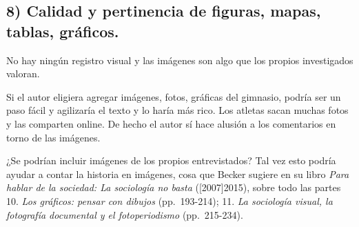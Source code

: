 \subsection*{8) Calidad y pertinencia de figuras, mapas, tablas, gráficos.}\label{calidad-y-pertinencia-de-figuras-mapas-tablas-gruxe1ficos.}

No hay ningún registro visual y las imágenes son algo que los propios investigados valoran.

Si el autor eligiera agregar imágenes, fotos, gráficas del gimnasio,
podría ser un paso fácil y agilizaría el texto y lo haría más rico.
Los atletas sacan muchas fotos y las comparten online.
De hecho el autor sí hace alusión a los comentarios en torno de las imágenes.

¿Se podrían incluir imágenes de los propios entrevistados?
Tal vez esto podría ayudar a contar la historia en imágenes, cosa que Becker sugiere
en su libro \emph{Para hablar de la sociedad: La sociología no basta}
({[}2007{]}2015), sobre todo las partes 10. \emph{Los gráficos: pensar
con dibujos} (pp.~193-214); 11. \emph{La sociología visual, la
fotografía documental y el fotoperiodismo} (pp.~215-234).

